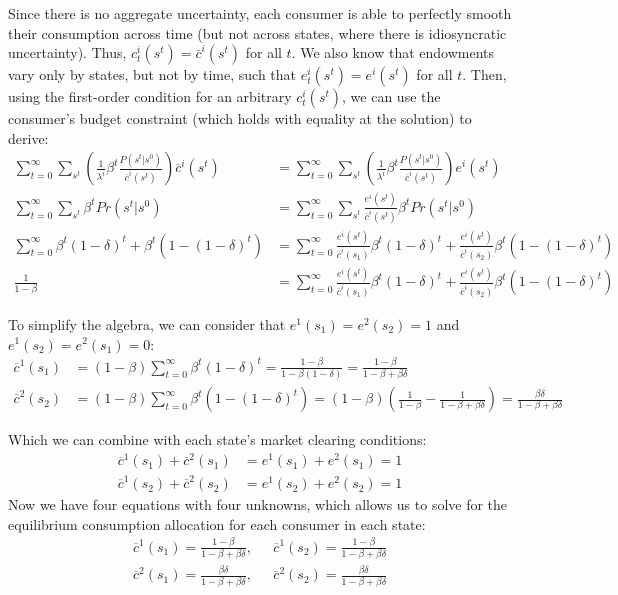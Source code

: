 \documentclass{article}
\begin{document}
\begin{enumerate}[(a)]
		Since there is no aggregate uncertainty, each consumer is able to perfectly smooth their consumption across time (but not across states, where there is idiosyncratic uncertainty). Thus, ${c^i_t(s^t)=\overline{c}^i(s^t)}$ for all $t$. We also know that endowments vary only by states, but not by time, such that ${e_t^i(s^t) = e^i(s^t)}$ for all $t$. Then, using the first-order condition for an arbitrary ${c_t^i(s^t)}$, we can use the consumer's budget constraint (which holds with equality at the solution) to derive:
		\begin{align*}
			\sum_{t=0}^\infty\sum_{s^t} \left(\frac{1}{\lambda^i}\beta^t\frac{P(s^t|s^0)}{\overline{c}^i(s^t)}\right)\overline{c}^i(s^t)
				&= \sum_{t=0}^\infty\sum_{s^t} \left(\frac{1}{\lambda^i}\beta^t\frac{P(s^t|s^0)}{\overline{c}^i(s^t)}\right)e^i(s^t)	\\
			\sum_{t=0}^\infty\sum_{s^t}\beta^tPr(s^t|s^0) &= \sum_{t=0}^\infty\sum_{s^t}\frac{e^i(s^t)}{\overline{c}^i(s^t)}\beta^tPr(s^t|s^0)	\\
			\sum_{t=0}^\infty\beta^t(1-\delta)^t + \beta^t(1-(1-\delta)^t)  &= 
			\sum_{t=0}^\infty\frac{e^i(s^t)}{\overline{c}^i(s_1)}\beta^t(1-\delta)^t	+ \frac{e^i(s^t)}{\overline{c}^i(s_2)}\beta^t(1-(1-\delta)^t) \\
			\frac{1}{1-\beta}	&= \sum_{t=0}^\infty\frac{e^i(s^t)}{\overline{c}^i(s_1)}\beta^t(1-\delta)^t	+ \frac{e^i(s^t)}{\overline{c}^i(s_2)}\beta^t(1-(1-\delta)^t)	
		\end{align*}
		
		To simplify the algebra, we can consider that ${e^1(s_1)=e^2(s_2)=1}$ and ${e^1(s_2)=e^2(s_1)=0}$:
		\begin{align*}
			\overline{c}^1(s_1) &= \left(1-\beta\right)\sum_{t=0}^\infty\beta^t(1-\delta)^t	 = \frac{1-\beta}{1-\beta(1-\delta)} = \frac{1-\beta}{1-\beta+\beta\delta}	\\
			\overline{c}^2(s_2) &= \left(1-\beta\right)\sum_{t=0}^\infty\beta^t(1-(1-\delta)^t)	= \left(1-\beta\right)\left(\frac{1}{1-\beta} - \frac{1}{1-\beta+\beta\delta}\right) = \frac{\beta\delta}{1-\beta+\beta\delta}
		\end{align*}
		
		Which we can combine with each state's market clearing conditions:
			\begin{align*}
				\overline{c}^1(s_1) + \overline{c}^2(s_1) &= e^1(s_1) + e^2(s_1) = 1	\\
				\overline{c}^1(s_2) + \overline{c}^2(s_2) &= e^1(s_2) + e^2(s_2) = 1
			\end{align*}
		Now we have four equations with four unknowns, which allows us to solve for the equilibrium consumption allocation for each consumer in each state:
		\begin{align*}
			\overline{c}^1(s_1) = \frac{1-\beta}{1-\beta+\beta\delta}, 		& \text{ }\overline{c}^1(s_2) = \frac{1-\beta}{1-\beta+\beta\delta}		\\
			\overline{c}^2(s_1) = \frac{\beta\delta}{1-\beta+\beta\delta}, 	& \text{ }\overline{c}^2(s_2) = \frac{\beta\delta}{1-\beta+\beta\delta}		
		\end{align*}
	

\end{enumerate}
\end{document}
